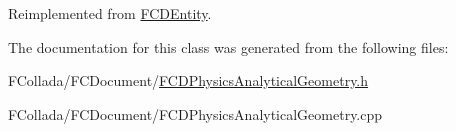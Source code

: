 Reimplemented from \hyperlink{classFCDEntity_abfd4312a7124f92364c1e6517c7e60ba}{FCDEntity}.



The documentation for this class was generated from the following files:\begin{DoxyCompactItemize}
\item 
FCollada/FCDocument/\hyperlink{FCDPhysicsAnalyticalGeometry_8h}{FCDPhysicsAnalyticalGeometry.h}\item 
FCollada/FCDocument/FCDPhysicsAnalyticalGeometry.cpp\end{DoxyCompactItemize}
